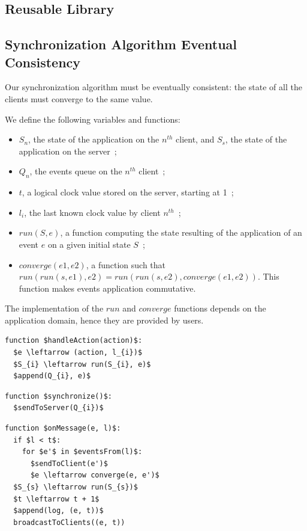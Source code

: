 \documentclass{acm_proc_article-sp}
\begin{document}
\subsection{Reusable Library}

\subsection{Synchronization Algorithm Eventual Consistency}

Our synchronization algorithm must be eventually consistent: the state of all the clients must converge to the same value.

We define the following variables and functions:

\begin{itemize}
 \item $S_{n}$, the state of the application on the $n^{th}$ client, and $S_{s}$, the state of the application on the server~;
 \item $Q_{n}$, the events queue on the $n^{th}$ client~;
 \item $t$, a logical clock value stored on the server, starting at 1~;
 \item $l_{i}$, the last known clock value by client $n^{th}$~;
 \item $run(S,e)$, a function computing the state resulting of the application of an event $e$ on a given initial state $S$~;
 \item $converge(e1,e2)$, a function such that $run(run(s,e1),e2)=run(run(s,e2),converge(e1,e2))$. This function makes events application commutative.
\end{itemize}

The implementation of the $run$ and $converge$ functions depends on the application domain, hence they are provided by users.

\begin{lstlisting}[mathescape]
function $handleAction(action)$:
  $e \leftarrow (action, l_{i})$
  $S_{i} \leftarrow run(S_{i}, e)$
  $append(Q_{i}, e)$
\end{lstlisting}

\begin{lstlisting}[mathescape]
function $synchronize()$:
  $sendToServer(Q_{i})$
\end{lstlisting}

\begin{lstlisting}[mathescape]
function $onMessage(e, l)$:
  if $l < t$:
    for $e'$ in $eventsFrom(l)$:
      $sendToClient(e')$
      $e \leftarrow converge(e, e')$
  $S_{s} \leftarrow run(S_{s})$
  $t \leftarrow t + 1$
  $append(log, (e, t))$
  broadcastToClients((e, t))
\end{lstlisting}
\end{document}
